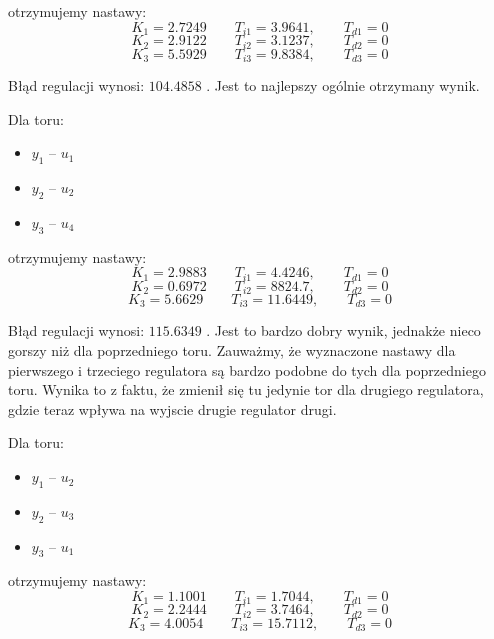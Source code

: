 otrzymujemy nastawy:
\begin{equation}
  K_1 = \num{2,7249} \qquad T_{i1} = \num{3,9641}, \qquad T_{d1} = 0 \nonumber
\end{equation}
\begin{equation}
  K_2 = \num{2,9122} \qquad T_{i2} = \num{3,1237}, \qquad T_{d2} = 0
\end{equation}
\begin{equation}
  K_3 = \num{5,5929} \qquad T_{i3} = \num{9,8384}, \qquad T_{d3} = 0 \nonumber
\end{equation}

Błąd regulacji wynosi: $\num{104,4858}$ . Jest to najlepszy ogólnie otrzymany wynik.

Dla toru:
\begin{itemize}
  \item $y_1$ -- $u_1$
 \item $y_2$ -- $u_2$
 \item $y_3$ -- $u_4$
\end{itemize}

otrzymujemy nastawy:
\begin{equation}
  K_1 = \num{2,9883} \qquad T_{i1} = \num{4,4246}, \qquad T_{d1} = 0 \nonumber
\end{equation}
\begin{equation}
  K_2 = \num{0,6972} \qquad T_{i2} = \num{8824,7}, \qquad T_{d2} = 0
\end{equation}
\begin{equation}
  K_3 = \num{5,6629} \qquad T_{i3} = \num{11,6449}, \qquad T_{d3} = 0 \nonumber
\end{equation}

Błąd regulacji wynosi: $\num{115,6349}$ .
Jest to bardzo dobry wynik, jednakże nieco gorszy niż dla poprzedniego toru.
Zauważmy, że wyznaczone nastawy dla pierwszego i trzeciego regulatora są bardzo podobne do tych dla poprzedniego toru.
Wynika to z faktu, że zmienił się tu jedynie tor dla drugiego regulatora, gdzie teraz wpływa na wyjscie drugie regulator drugi.

Dla toru:
\begin{itemize}
  \item $y_1$ -- $u_2$
 \item $y_2$ -- $u_3$
 \item $y_3$ -- $u_1$
\end{itemize}

otrzymujemy nastawy:
\begin{equation}
  K_1 = \num{1,1001} \qquad T_{i1} = \num{1,7044}, \qquad T_{d1} = 0 \nonumber
\end{equation}
\begin{equation}
  K_2 = \num{2,2444} \qquad T_{i2} = \num{3,7464}, \qquad T_{d2} = 0
\end{equation}
\begin{equation}
  K_3 = \num{4,0054} \qquad T_{i3} = \num{15,7112}, \qquad T_{d3} = 0 \nonumber
\end{equation}

